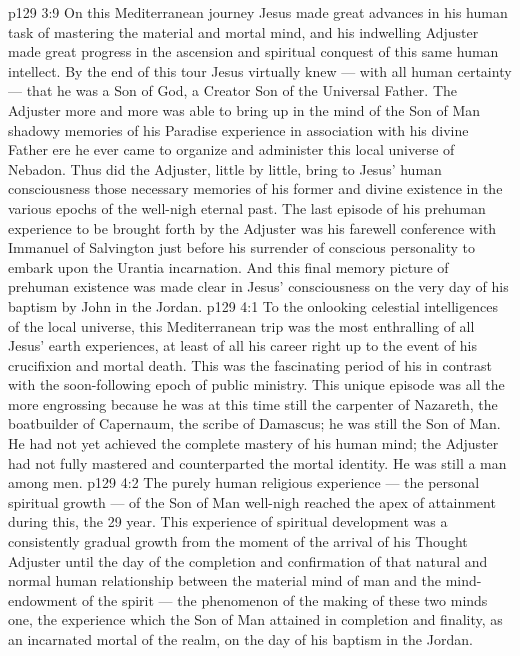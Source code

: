 \vs p129 3:9 On this Mediterranean journey Jesus made great advances in his human task of mastering the material and mortal mind, and his indwelling Adjuster made great progress in the ascension and spiritual conquest of this same human intellect. By the end of this tour Jesus virtually knew --- with all human certainty --- that he was a Son of God, a Creator Son of the Universal Father. The Adjuster more and more was able to bring up in the mind of the Son of Man shadowy memories of his Paradise experience in association with his divine Father ere he ever came to organize and administer this local universe of Nebadon. Thus did the Adjuster, little by little, bring to Jesus’ human consciousness those necessary memories of his former and divine existence in the various epochs of the well\hyp{}nigh eternal past. The last episode of his prehuman experience to be brought forth by the Adjuster was his farewell conference with Immanuel of Salvington just before his surrender of conscious personality to embark upon the Urantia incarnation. And this final memory picture of prehuman existence was made clear in Jesus’ consciousness on the very day of his baptism by John in the Jordan.
\vs p129 4:1 To the onlooking celestial intelligences of the local universe, this Mediterranean trip was the most enthralling of all Jesus’ earth experiences, at least of all his career right up to the event of his crucifixion and mortal death. This was the fascinating period of his  in contrast with the soon\hyp{}following epoch of public ministry. This unique episode was all the more engrossing because he was at this time still the carpenter of Nazareth, the boatbuilder of Capernaum, the scribe of Damascus; he was still the Son of Man. He had not yet achieved the complete mastery of his human mind; the Adjuster had not fully mastered and counterparted the mortal identity. He was still a man among men.
\vs p129 4:2 The purely human religious experience --- the personal spiritual growth --- of the Son of Man well\hyp{}nigh reached the apex of attainment during this, the 29 year. This experience of spiritual development was a consistently gradual growth from the moment of the arrival of his Thought Adjuster until the day of the completion and confirmation of that natural and normal human relationship between the material mind of man and the mind\hyp{}endowment of the spirit --- the phenomenon of the making of these two minds one, the experience which the Son of Man attained in completion and finality, as an incarnated mortal of the realm, on the day of his baptism in the Jordan.
